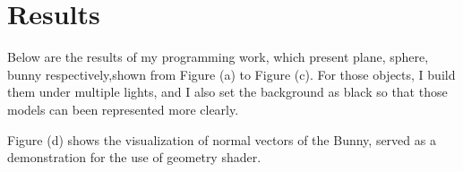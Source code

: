 \documentclass[acmtog]{acmart}
\begin{document}
\section{Results}
\qquad Below are the results of my programming work, which present plane, sphere, bunny respectively,shown from Figure (a) to Figure (c). For those objects, I build them under multiple lights, and I also set the background as black so that those models can been represented more clearly.

\begin{figure}[htbp]
	\centering
	\quad
	\quad
	\quad
\end{figure}
 Figure (d) shows the visualization of normal vectors of the Bunny, served as a demonstration for the use of geometry shader.
\end{document}
